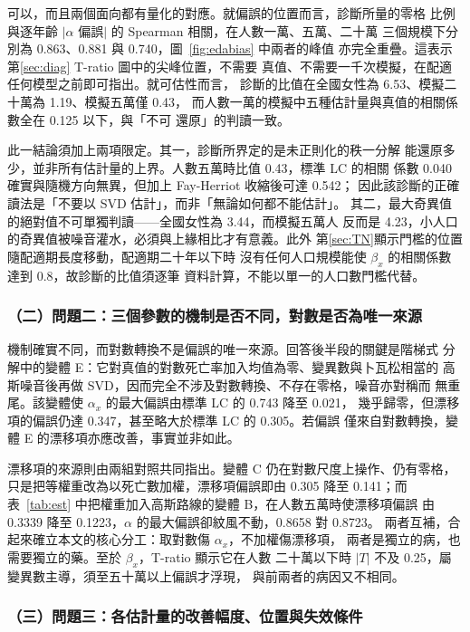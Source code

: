 \documentclass[UTF8, fontset=macnew, a4paper, 12pt]{ctexart}
\newcommand{\cn}[1]{\ding{\number\numexpr171+#1\relax}}
\begin{document}
可以，而且兩個面向都有量化的對應。就偏誤的位置而言，診斷\cn{2}所量的零格
比例與逐年齡 $|\alpha$ 偏誤$|$ 的 Spearman 相關，在人數一萬、五萬、二十萬
三個規模下分別為 0.863、0.881 與 0.740，圖~\ref{fig:edabias} 中兩者的峰值
亦完全重疊。這表示第\ref{sec:diag} T-ratio 圖中的尖峰位置，不需要
真值、不需要一千次模擬，在配適任何模型之前即可指出。就可估性而言，
診斷\cn{4}的比值在全國女性為 6.53、模擬二十萬為 1.19、模擬五萬僅 0.43，
而人數一萬的模擬中五種估計量與真值的相關係數全在 0.125 以下，與「不可
還原」的判讀一致。

此一結論須加上兩項限定。其一，診斷\cn{4}所界定的是未正則化的秩一分解
能還原多少，並非所有估計量的上界。人數五萬時比值 0.43，標準 LC 的相關
係數 0.040 確實與隨機方向無異，但加上 Fay-Herriot 收縮後可達 0.542；
因此該診斷的正確讀法是「不要以 SVD 估計」，而非「無論如何都不能估計」。
其二，最大奇異值的絕對值不可單獨判讀——全國女性為 3.44，而模擬五萬人
反而是 4.23，小人口的奇異值被噪音灌水，必須與上緣相比才有意義。此外
第\ref{sec:TN}顯示門檻的位置隨配適期長度移動，配適期二十年以下時
沒有任何人口規模能使 $\beta_x$ 的相關係數達到 0.8，故診斷的比值須逐筆
資料計算，不能以單一的人口數門檻代替。

\subsubsection{（二）問題二：三個參數的機制是否不同，對數是否為唯一來源}

機制確實不同，而對數轉換不是偏誤的唯一來源。回答後半段的關鍵是階梯式
分解中的變體 E：它對真值的對數死亡率加入均值為零、變異數與卜瓦松相當的
高斯噪音後再做 SVD，因而完全不涉及對數轉換、不存在零格，噪音亦對稱而
無重尾。該變體使 $\alpha_x$ 的最大偏誤由標準 LC 的 0.743 降至 0.021，
幾乎歸零，但漂移項的偏誤仍達 0.347，甚至略大於標準 LC 的 0.305。若偏誤
僅來自對數轉換，變體 E 的漂移項亦應改善，事實並非如此。

漂移項的來源則由兩組對照共同指出。變體 C 仍在對數尺度上操作、仍有零格，
只是把等權重改為以死亡數加權，漂移項偏誤即由 0.305 降至 0.141；而
表~\ref{tab:est} 中把權重加入高斯路線的變體 B，在人數五萬時使漂移項偏誤
由 0.3339 降至 0.1223，$\alpha$ 的最大偏誤卻紋風不動，0.8658 對 0.8723。
兩者互補，合起來確立本文的核心分工：取對數傷 $\alpha_x$，不加權傷漂移項，
兩者是獨立的病，也需要獨立的藥。至於 $\beta_x$，T-ratio 顯示它在人數
二十萬以下時 $|T|$ 不及 0.25，屬變異數主導，須至五十萬以上偏誤才浮現，
與前兩者的病因又不相同。

\subsubsection{（三）問題三：各估計量的改善幅度、位置與失效條件}
\end{document}
